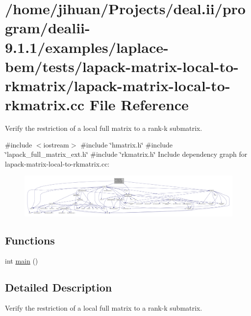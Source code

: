 \hypertarget{lapack-matrix-local-to-rkmatrix_8cc}{}\section{/home/jihuan/\+Projects/deal.ii/program/dealii-\/9.1.1/examples/laplace-\/bem/tests/lapack-\/matrix-\/local-\/to-\/rkmatrix/lapack-\/matrix-\/local-\/to-\/rkmatrix.cc File Reference}
\label{lapack-matrix-local-to-rkmatrix_8cc}


Verify the restriction of a local full matrix to a rank-\/k submatrix.  


{\ttfamily \#include $<$iostream$>$}\newline
{\ttfamily \#include \char`\"{}hmatrix.\+h\char`\"{}}\newline
{\ttfamily \#include \char`\"{}lapack\+\_\+full\+\_\+matrix\+\_\+ext.\+h\char`\"{}}\newline
{\ttfamily \#include \char`\"{}rkmatrix.\+h\char`\"{}}\newline
Include dependency graph for lapack-\/matrix-\/local-\/to-\/rkmatrix.cc\+:\nopagebreak
\begin{figure}[H]
\begin{center}
\leavevmode
\includegraphics[width=350pt]{lapack-matrix-local-to-rkmatrix_8cc__incl}
\end{center}
\end{figure}
\subsection*{Functions}
\begin{DoxyCompactItemize}
\item 
int \hyperlink{lapack-matrix-local-to-rkmatrix_8cc_ae66f6b31b5ad750f1fe042a706a4e3d4}{main} ()
\end{DoxyCompactItemize}


\subsection{Detailed Description}
Verify the restriction of a local full matrix to a rank-\/k submatrix. 

